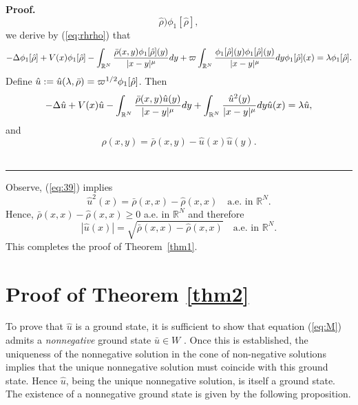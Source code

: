 \documentclass[12pt,thmsa]{article}
\newenvironment{proof}[1][Proof]{\noindent\textbf{#1.} }{\ \rule{0.5em}{0.5em}}
\begin{document}
\begin{proof}
\begin{equation*}
\hat{\rho})\phi _{1}[\hat{\rho}],
\end{equation*}%
we derive by (\ref{eq:rhrho}) that
\begin{equation*}
-\Delta \phi _{1}[\hat{\rho}]+V(x)\phi _{1}[\hat{\rho}]-\int_{\mathbb{R}^{N}}%
\frac{{\bar{\rho}}(x,y)\phi _{1}[\hat{\rho}](y)}{|x-y|^{\mu }}dy+\varpi
\int_{\mathbb{R}^{N}}\frac{\phi _{1}[\hat{\rho}](y)\phi _{1}[\hat{\rho}](y)}{%
|x-y|^{\mu }}dy\phi _{1}[\hat{\rho}](x)=\lambda \phi _{1}[\hat{\rho}].
\end{equation*}%
Define $\hat{u}:=\hat{u}(\lambda ,\bar{\rho})=\varpi ^{1/2}\phi _{1}[\hat{%
\rho}]$. Then
\begin{equation*}
-\Delta \hat{u}+V(x)\hat{u}-\int_{\mathbb{R}^{N}}\frac{{\bar{\rho}}(x,y)\hat{%
u}(y)}{|x-y|^{\mu }}dy+\int_{\mathbb{R}^{N}}\frac{\hat{u}^{2}(y)}{|x-y|^{\mu
}}dy\hat{u}(x)=\lambda \hat{u},
\end{equation*}%
and
\begin{equation}
\hat{\rho}(x,y)=\bar{\rho}(x,y)-\hat{u}(x)\hat{u}(y).  \label{eq:39}
\end{equation}
\end{proof}

Observe, (\ref{eq:39}) implies
\begin{equation*}
\hat{u}^{2}(x)=\bar{\rho}(x,x)-\hat{\rho}(x,x)\quad \text{a.e. in }\mathbb{R}%
^{N}.
\end{equation*}%
Hence, $\bar{\rho}(x,x)-\hat{\rho}(x,x)\geq 0$ a.e. in $\mathbb{R}^{N}$ and
therefore
\begin{equation*}
|\hat{u}(x)|=\sqrt{\bar{\rho}(x,x)-\hat{\rho}(x,x)}\quad \text{a.e. in }%
\mathbb{R}^{N}.
\end{equation*}%
This completes the proof of Theorem~\ref{thm1}.

\section{Proof of Theorem \protect\ref{thm2}}

To prove that $\hat{u}$ is a ground state, it is sufficient to show that
equation (\ref{eq:M}) admits a \emph{nonnegative} ground state $\bar{u}\in W$%
. Once this is established, the uniqueness of the nonnegative solution in
the cone of non-negative solutions implies that the unique nonnegative
solution must coincide with this ground state. Hence $\hat{u}$, being the
unique nonnegative solution, is itself a ground state. The existence of a
nonnegative ground state is given by the following proposition.
\end{document}

